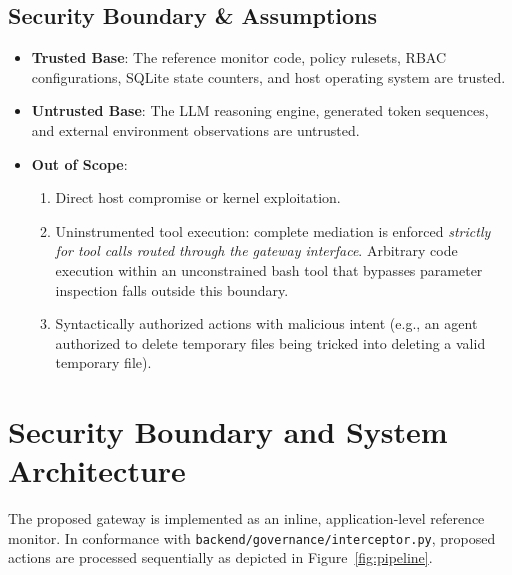 \documentclass[10pt,twocolumn,letterpaper]{article}
\begin{document}
\subsection{Security Boundary \& Assumptions}
\begin{itemize}
    \item \textbf{Trusted Base}: The reference monitor code, policy rulesets, RBAC configurations, SQLite state counters, and host operating system are trusted.
    \item \textbf{Untrusted Base}: The LLM reasoning engine, generated token sequences, and external environment observations are untrusted.
    \item \textbf{Out of Scope}: 
    \begin{enumerate}
        \item Direct host compromise or kernel exploitation.
        \item Uninstrumented tool execution: complete mediation is enforced \emph{strictly for tool calls routed through the gateway interface}. Arbitrary code execution within an unconstrained bash tool that bypasses parameter inspection falls outside this boundary.
        \item Syntactically authorized actions with malicious intent (e.g., an agent authorized to delete temporary files being tricked into deleting a valid temporary file).
    \end{enumerate}
\end{itemize}

\section{Security Boundary and System Architecture}

The proposed gateway is implemented as an inline, application-level reference monitor. In conformance with \texttt{backend/governance/interceptor.py}, proposed actions are processed sequentially as depicted in Figure~\ref{fig:pipeline}.
\end{document}
